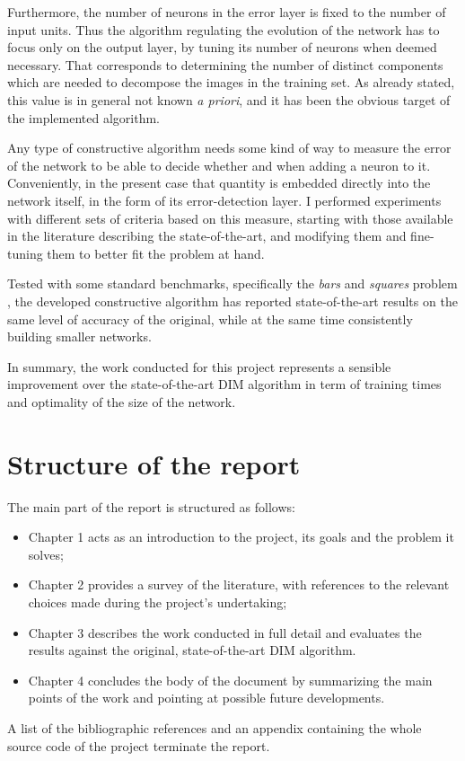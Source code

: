 \documentclass[11pt,a4paper]{report}
\begin{document}
			Furthermore, the number of neurons in the error layer is fixed to the number of input units. Thus the algorithm regulating the evolution of the network has to focus only on the output layer, by tuning its number of neurons when deemed necessary. That corresponds to determining the number of distinct components which are needed to decompose the images in the training set. As already stated, this value is in general not known \emph{a priori}, and it has been the obvious target of the implemented algorithm.
		
			Any type of constructive algorithm needs some kind of way to measure the error of the network to be able to decide whether and when adding a neuron to it. Conveniently, in the present case that quantity is embedded directly into the network itself, in the form of its error-detection layer. I performed experiments with different sets of criteria based on this measure, starting with those available in the literature describing the state-of-the-art, and modifying them and fine-tuning them to better fit the problem at hand.
		
			Tested with some standard benchmarks, specifically the \emph{bars} \cite{spratling2012unsupervised} and \emph{squares} problem \cite{spratling2009unsupervised}, the developed constructive algorithm has reported state-of-the-art results on the same level of accuracy of the original, while at the same time consistently building smaller networks.
		
			In summary, the work conducted for this project represents a sensible improvement over the state-of-the-art DIM algorithm in term of training times and optimality of the size of the network.

		\section{Structure of the report}
			The main part of the report is structured as follows:
			\begin{itemize}
				\item Chapter 1 acts as an introduction to the project, its goals and the problem it solves;
				\item Chapter 2 provides a survey of the literature, with references to the relevant choices made during the project's undertaking;
				\item Chapter 3 describes the work conducted in full detail and evaluates the results against the original, state-of-the-art DIM algorithm.
				\item Chapter 4 concludes the body of the document by summarizing the main points of the work and pointing at possible future developments.
			\end{itemize}
			A list of the bibliographic references and an appendix containing the whole source code of the project terminate the report.
	
\end{document}
